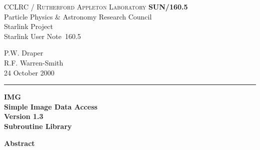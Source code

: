 \documentclass[twoside,11pt]{article}
\newcommand{\stardoccategory}  {Starlink User Note}
\newcommand{\stardocinitials}  {SUN}
\newcommand{\stardocnumber}    {160.5}
\newcommand{\stardocauthors}   {P.W. Draper \\
                                R.F. Warren-Smith}
\newcommand{\stardocdate}      {24 October 2000}
\newcommand{\stardoctitle}     {IMG \\ [1ex]
                                Simple Image Data Access}
\newcommand{\stardocversion}   {Version 1.3}
\newcommand{\stardocmanual}    {Subroutine Library}
\newcommand{\stardocname}{\stardocinitials /\stardocnumber}
\newenvironment{latexonly}{}{}
\renewcommand{\_}{\texttt{\symbol{95}}}
\begin{document}
\thispagestyle{empty}

\begin{latexonly}
   CCLRC / \textsc{Rutherford Appleton Laboratory} \hfill \textbf{\stardocname}\\
   {\large Particle Physics \& Astronomy Research Council}\\
   {\large Starlink Project\\}
   {\large \stardoccategory\ \stardocnumber}
   \begin{flushright}
   \stardocauthors\\
   \stardocdate
   \end{flushright}
   \vspace{-4mm}
   \rule{\textwidth}{0.5mm}
   \vspace{5mm}
   \begin{center}
   {\Huge\textbf{\stardoctitle \\ [2.5ex]}}
   {\LARGE\textbf{\stardocversion \\ [4ex]}}
   {\Huge\textbf{\stardocmanual}}
   \end{center}
   \vspace{5mm}


   \vspace{10mm}
   \begin{center}
      {\Large\textbf{Abstract}}
   \end{center}
\end{latexonly}
\end{document}
